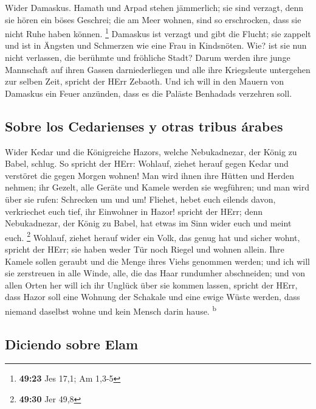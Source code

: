  Wider Damaskus. Hamath und Arpad stehen jämmerlich; sie
sind verzagt, denn sie hören ein böses Geschrei; die am Meer wohnen,
sind so erschrocken, dass sie nicht Ruhe haben können. \footnote{\textbf{49:23}
  Jes 17,1; Am 1,3-5}  Damaskus ist verzagt und gibt die
Flucht; sie zappelt und ist in Ängsten und Schmerzen wie eine Frau in
Kindsnöten.  Wie? ist sie nun nicht verlassen, die
berühmte und fröhliche Stadt?  Darum werden ihre junge
Mannschaft auf ihren Gassen darniederliegen und alle ihre Kriegsleute
untergehen zur selben Zeit, spricht der HErr Zebaoth. 
Und ich will in den Mauern von Damaskus ein Feuer anzünden, dass es die
Paläste Benhadads verzehren soll.

\hypertarget{sobre-los-cedarienses-y-otras-tribus-uxe1rabes}{%
\subsection{Sobre los Cedarienses y otras tribus
árabes}\label{sobre-los-cedarienses-y-otras-tribus-uxe1rabes}}

 Wider Kedar und die Königreiche Hazors, welche
Nebukadnezar, der König zu Babel, schlug. So spricht der HErr: Wohlauf,
ziehet herauf gegen Kedar und verstöret die gegen Morgen wohnen!
 Man wird ihnen ihre Hütten und Herden nehmen; ihr
Gezelt, alle Geräte und Kamele werden sie wegführen; und man wird über
sie rufen: Schrecken um und um!  Fliehet, hebet euch
eilends davon, verkriechet euch tief, ihr Einwohner in Hazor! spricht
der HErr; denn Nebukadnezar, der König zu Babel, hat etwas im Sinn wider
euch und meint euch. \footnote{\textbf{49:30} Jer 49,8} 
Wohlauf, ziehet herauf wider ein Volk, das genug hat und sicher wohnt,
spricht der HErr; sie haben weder Tür noch Riegel und wohnen allein.
 Ihre Kamele sollen geraubt und die Menge ihres Viehs
genommen werden; und ich will sie zerstreuen in alle Winde, alle, die
das Haar rundumher abschneiden; und von allen Orten her will ich ihr
Unglück über sie kommen lassen, spricht der HErr,  dass
Hazor soll eine Wohnung der Schakale und eine ewige Wüste werden, dass
niemand daselbst wohne und kein Mensch darin hause. \textsuperscript{b}

\hypertarget{diciendo-sobre-elam}{%
\subsection{Diciendo sobre Elam}\label{diciendo-sobre-elam}}

